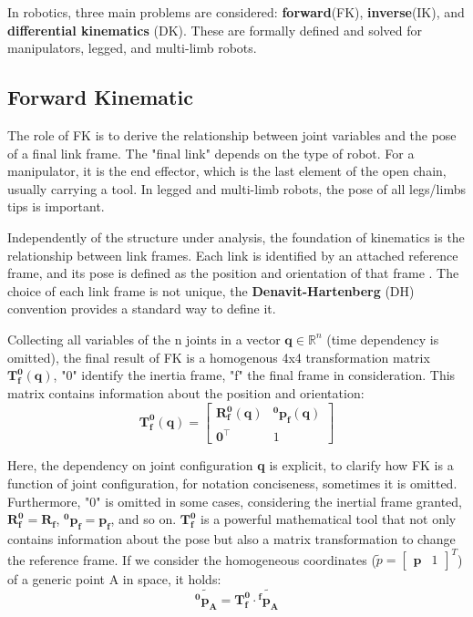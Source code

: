 In robotics, three main problems are considered: \textbf{forward}(FK), \textbf{inverse}(IK), and \textbf{differential kinematics} (DK). These are formally defined and solved for manipulators, legged, and multi-limb robots. 

\subsection{Forward Kinematic}
\label{sec:forward}
The role of FK is to derive the relationship between joint variables and the pose of a final link frame\cite{CorkeMATLAB}\cite{Siciliano}. 
The "final link" depends on the type of robot. 
For a manipulator, it is the end effector, which is the last element of the open chain, usually carrying a tool. 
In legged and multi-limb robots, the pose of all legs/limbs tips is important. 

Independently of the structure under analysis, the foundation of kinematics is the relationship between link frames. Each link is identified by an attached reference frame, and its pose is defined as the position and orientation of that frame \cite{Siciliano}\cite{RoboticMechanics}\cite{CorkeMATLAB}.
The choice of each link frame is not unique, the \textbf{Denavit-Hartenberg} (DH) convention \cite{DenavitHartenberg} provides a standard way to define it.

Collecting all variables of the n joints in a vector $\mathbf{q} \in \mathbb{R}^n$ (time dependency is omitted), the final result of FK is a homogenous 4x4 transformation matrix $\mathbf{T^0_f(\mathbf{q})}$, "0" identify the inertia frame, "f" the final frame in consideration. 
This matrix contains information about the position and orientation: 
\begin{equation}
\label{eq:homogeneus}
    \mathbf{T^0_f(\mathbf{q})} =
        \begin{bmatrix}
        \mathbf{R^0_f(\mathbf{q})} & \mathbf{^0p_f(\mathbf{q})} \\
        \mathbf{0}^{\top} & 1
        \end{bmatrix}
\end{equation}

Here, the dependency on joint configuration \textbf{q} is explicit, to clarify how FK is a function of joint configuration, for notation conciseness, sometimes it is omitted.
Furthermore, "0" is omitted in some cases, considering the inertial frame granted, 
$\mathbf{R^0_f} = \mathbf{R_f}$, $\mathbf{^0p_f} = \mathbf{p_f}$, and so on.
$\mathbf{T^0_f}$ is a powerful mathematical tool that not only contains information about the pose but also a matrix transformation to change the reference frame. If we consider the homogeneous coordinates ($\tilde{p} = \begin{bmatrix}
    \textbf{p} & 1
\end{bmatrix}^T$) of a generic point A in space, it holds:
\begin{equation}
\label{eq:pointTransform}
    \mathbf{\tilde{^0p_A}} = \mathbf{T^0_f} \cdot \mathbf{\tilde{^fp_A}} 
\end{equation}


